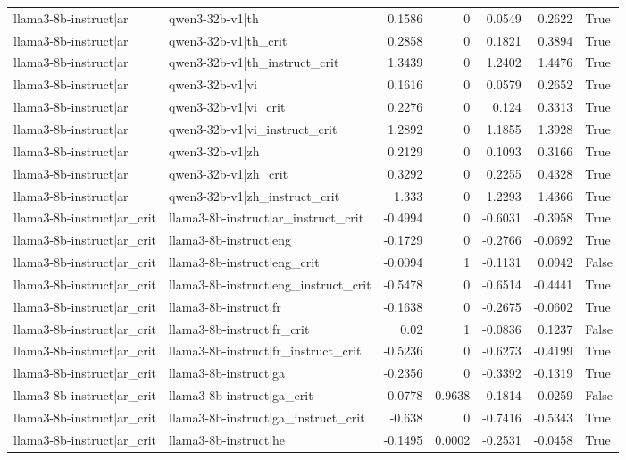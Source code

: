 \begin{table}
\begin{tabular}{l l r r r r l}
llama3-8b-instruct|ar & qwen3-32b-v1|th & 0.1586 & 0 & 0.0549 & 0.2622 & True \\
llama3-8b-instruct|ar & qwen3-32b-v1|th_crit & 0.2858 & 0 & 0.1821 & 0.3894 & True \\
llama3-8b-instruct|ar & qwen3-32b-v1|th_instruct_crit & 1.3439 & 0 & 1.2402 & 1.4476 & True \\
llama3-8b-instruct|ar & qwen3-32b-v1|vi & 0.1616 & 0 & 0.0579 & 0.2652 & True \\
llama3-8b-instruct|ar & qwen3-32b-v1|vi_crit & 0.2276 & 0 & 0.124 & 0.3313 & True \\
llama3-8b-instruct|ar & qwen3-32b-v1|vi_instruct_crit & 1.2892 & 0 & 1.1855 & 1.3928 & True \\
llama3-8b-instruct|ar & qwen3-32b-v1|zh & 0.2129 & 0 & 0.1093 & 0.3166 & True \\
llama3-8b-instruct|ar & qwen3-32b-v1|zh_crit & 0.3292 & 0 & 0.2255 & 0.4328 & True \\
llama3-8b-instruct|ar & qwen3-32b-v1|zh_instruct_crit & 1.333 & 0 & 1.2293 & 1.4366 & True \\
llama3-8b-instruct|ar_crit & llama3-8b-instruct|ar_instruct_crit & -0.4994 & 0 & -0.6031 & -0.3958 & True \\
llama3-8b-instruct|ar_crit & llama3-8b-instruct|eng & -0.1729 & 0 & -0.2766 & -0.0692 & True \\
llama3-8b-instruct|ar_crit & llama3-8b-instruct|eng_crit & -0.0094 & 1 & -0.1131 & 0.0942 & False \\
llama3-8b-instruct|ar_crit & llama3-8b-instruct|eng_instruct_crit & -0.5478 & 0 & -0.6514 & -0.4441 & True \\
llama3-8b-instruct|ar_crit & llama3-8b-instruct|fr & -0.1638 & 0 & -0.2675 & -0.0602 & True \\
llama3-8b-instruct|ar_crit & llama3-8b-instruct|fr_crit & 0.02 & 1 & -0.0836 & 0.1237 & False \\
llama3-8b-instruct|ar_crit & llama3-8b-instruct|fr_instruct_crit & -0.5236 & 0 & -0.6273 & -0.4199 & True \\
llama3-8b-instruct|ar_crit & llama3-8b-instruct|ga & -0.2356 & 0 & -0.3392 & -0.1319 & True \\
llama3-8b-instruct|ar_crit & llama3-8b-instruct|ga_crit & -0.0778 & 0.9638 & -0.1814 & 0.0259 & False \\
llama3-8b-instruct|ar_crit & llama3-8b-instruct|ga_instruct_crit & -0.638 & 0 & -0.7416 & -0.5343 & True \\
llama3-8b-instruct|ar_crit & llama3-8b-instruct|he & -0.1495 & 0.0002 & -0.2531 & -0.0458 & True \\

\end{tabular}
\end{table}
